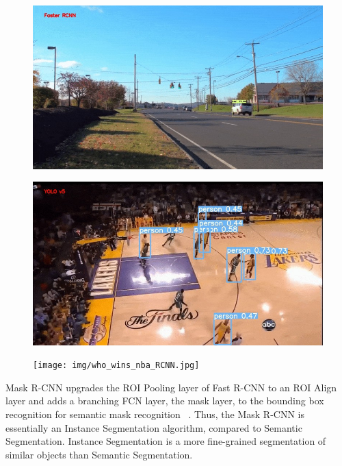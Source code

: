 \begin{figure}[p]
    \centering
    \includegraphics[scale=0.5]{img/who_wins_traffic_light_RCNN.jpg}
    \label{fig:who_wins_traffic_light_RCNN}
\end{figure}

\begin{figure}[p]
    \centering
    \includegraphics[scale=0.5]{img/who_wins_nba_YOLO.jpg}
    \label{fig:who_wins_nba_YOLO}
\end{figure}

\begin{figure}[p]
    \centering
    \texttt{[image: img/who\_wins\_nba\_RCNN.jpg]}
    \label{fig:who_wins_nba_RCNN}
\end{figure}

Mask R-CNN upgrades the ROI Pooling layer of Fast R-CNN to an ROI Align layer and adds a branching FCN layer, the mask layer, to the bounding box recognition for semantic mask recognition ~\cite{he2017mask}. Thus, the Mask R-CNN is essentially an Instance Segmentation algorithm, compared to Semantic Segmentation. Instance Segmentation is a more fine-grained segmentation of similar objects than Semantic Segmentation.

